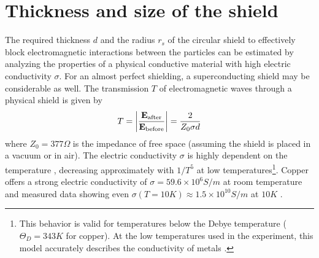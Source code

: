 \section{Thickness and size of the shield}\label{sec:5:shield-size}
The required thickness $d$ and the radius $r_s$ of the circular shield to effectively block electromagnetic interactions between the particles can be estimated by analyzing the properties of a physical conductive material with high electric conductivity $\sigma$.
For an almost perfect shielding, a superconducting shield may be considerable as well.
The transmission $T$ of electromagnetic waves through a physical shield is given by \cite{Vandenbosch_2022}
\begin{equation}\label{eq:5:shield-transmission}
  T = \abs{\frac{\vec{E}_\mathrm{after}}{\vec{E}_\mathrm{before}}} = \frac{2}{Z_0 \sigma d}
\end{equation}
where $Z_0 = 377\si{\Omega}$ is the impedance of free space (assuming the shield is placed in a vacuum or in air).
The electric conductivity $\sigma$ is highly dependent on the temperature \cite[p. 284-286]{Gross_2018}, decreasing approximately with $1/T^5$ at low temperatures\footnote{This behavior is valid for temperatures below the Debye temperature ($\Theta_D = 343\si{K}$ for copper). At the low temperatures used in the experiment, this model accurately describes the conductivity of metals \cite{Berman_1952}.}.
Copper offers a strong electric conductivity of $\sigma = 59.6\times 10^6 \si{S/m}$ at room temperature and measured data showing even $\sigma(T = 10\si{K}) \approx 1.5\times 10^{10}\si{S/m}$ at $10\si{K}$ \cite{Berman_1952}.


